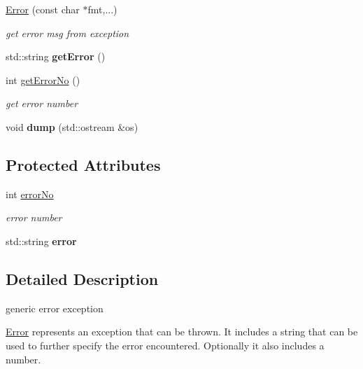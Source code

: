 \begin{DoxyCompactItemize}
\mbox{\label{classError_a04b610b88a09921231dbfd10f41b3d11}} 
\hyperlink{classError_a04b610b88a09921231dbfd10f41b3d11}{Error} (const char $\ast$fmt,...)
\begin{DoxyCompactList}\small\item\em get error msg from exception \end{DoxyCompactList}\item 
\mbox{\label{classError_aa2aec02f62fb7e8325c5bb793da64a90}} 
std\+::string {\bfseries get\+Error} ()
\item 
\mbox{\label{classError_a74ba8bd7fd5b5361be11daee8b5c6b1c}} 
int \hyperlink{classError_a74ba8bd7fd5b5361be11daee8b5c6b1c}{get\+Error\+No} ()
\begin{DoxyCompactList}\small\item\em get error number \end{DoxyCompactList}\item 
\mbox{\label{classError_a1a2e5f78dedac07786fe06969672eea7}} 
void {\bfseries dump} (std\+::ostream \&os)
\end{DoxyCompactItemize}
\subsection*{Protected Attributes}
\begin{DoxyCompactItemize}
\item 
int \hyperlink{classError_aca10c20ddc3769ff18c87d98052bbc3e}{error\+No}
\begin{DoxyCompactList}\small\item\em error number \end{DoxyCompactList}\item 
\mbox{\label{classError_a7ca1958fd4898587d70b88c0c0dc0695}} 
std\+::string {\bfseries error}
\end{DoxyCompactItemize}


\subsection{Detailed Description}
generic error exception 

\hyperlink{classError}{Error} represents an exception that can be thrown. It includes a string that can be used to further specify the error encountered. Optionally it also includes a number. 

